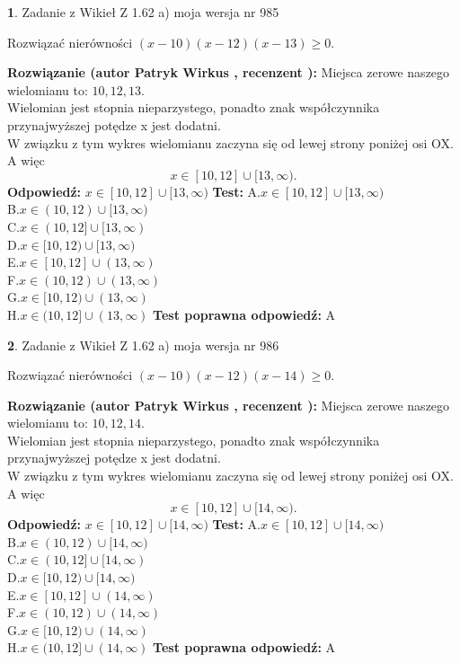 \documentclass[12pt, a4paper]{article}
\theoremstyle{definition} %
\newtheorem{zad}{}
\newcommand{\zadStart}[1]{\begin{zad}#1\newline}
\newcommand{\zadStop}{\end{zad}}
\newcommand{\rozwStart}[2]{\noindent \textbf{Rozwiązanie (autor #1 , recenzent #2): }\newline}
\newcommand{\rozwStop}{\newline}
\newcommand{\odpStart}{\noindent \textbf{Odpowiedź:}\newline}
\newcommand{\odpStop}{\newline}
\newcommand{\testStart}{\noindent \textbf{Test:}\newline}
\newcommand{\testStop}{\newline}
\newcommand{\kluczStart}{\noindent \textbf{Test poprawna odpowiedź:}\newline}
\newcommand{\kluczStop}{\newline}
\begin{document}
\zadStart{Zadanie z Wikieł Z 1.62 a) moja wersja nr 985}

Rozwiązać nierówności $(x-10)(x-12)(x-13)\ge0$.
\zadStop
\rozwStart{Patryk Wirkus}{}
Miejsca zerowe naszego wielomianu to: $10, 12, 13$.\\
Wielomian jest stopnia nieparzystego, ponadto znak współczynnika przy\linebreak najwyższej potędze x jest dodatni.\\ W związku z tym wykres wielomianu zaczyna się od lewej strony poniżej osi OX. A więc $$x \in [10,12] \cup [13,\infty).$$
\rozwStop
\odpStart
$x \in [10,12] \cup [13,\infty)$
\odpStop
\testStart
A.$x \in [10,12] \cup [13,\infty)$\\
B.$x \in (10,12) \cup [13,\infty)$\\
C.$x \in (10,12] \cup [13,\infty)$\\
D.$x \in [10,12) \cup [13,\infty)$\\
E.$x \in [10,12] \cup (13,\infty)$\\
F.$x \in (10,12) \cup (13,\infty)$\\
G.$x \in [10,12) \cup (13,\infty)$\\
H.$x \in (10,12] \cup (13,\infty)$
\testStop
\kluczStart
A
\kluczStop



\zadStart{Zadanie z Wikieł Z 1.62 a) moja wersja nr 986}

Rozwiązać nierówności $(x-10)(x-12)(x-14)\ge0$.
\zadStop
\rozwStart{Patryk Wirkus}{}
Miejsca zerowe naszego wielomianu to: $10, 12, 14$.\\
Wielomian jest stopnia nieparzystego, ponadto znak współczynnika przy\linebreak najwyższej potędze x jest dodatni.\\ W związku z tym wykres wielomianu zaczyna się od lewej strony poniżej osi OX. A więc $$x \in [10,12] \cup [14,\infty).$$
\rozwStop
\odpStart
$x \in [10,12] \cup [14,\infty)$
\odpStop
\testStart
A.$x \in [10,12] \cup [14,\infty)$\\
B.$x \in (10,12) \cup [14,\infty)$\\
C.$x \in (10,12] \cup [14,\infty)$\\
D.$x \in [10,12) \cup [14,\infty)$\\
E.$x \in [10,12] \cup (14,\infty)$\\
F.$x \in (10,12) \cup (14,\infty)$\\
G.$x \in [10,12) \cup (14,\infty)$\\
H.$x \in (10,12] \cup (14,\infty)$
\testStop
\kluczStart
A
\kluczStop
\end{document}
